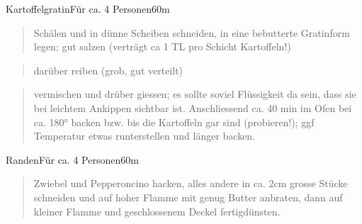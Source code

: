 \documentclass[
  a4paper,
]{article}
\begin{document}
\newpage

\begin{recipe}{Kartoffelgratin}{Für ca. 4 Personen}{60m}


\begin{quote}
Schälen und in dünne Scheiben schneiden, in eine bebutterte Gratinform
legen; gut salzen (verträgt ca 1 TL pro Schicht Kartoffeln!)
\end{quote}

\freeform\hrulefill


\begin{quote}
darüber reiben (grob, gut verteilt)
\end{quote}

\freeform\hrulefill


\begin{quote}
vermischen und drüber giessen; es sollte soviel Flüssigkeit da sein,
dass sie bei leichtem Ankippen sichtbar ist. Anschliessend ca. 40 min im
Ofen bei ca. 180° backen bzw. bis die Kartoffeln gar sind (probieren!);
ggf Temperatur etwas runterstellen und länger backen.
\end{quote}

\freeform\hrulefill\newline\freeform{}\end{recipe}

\newpage

\begin{recipe}{Randen}{Für ca. 4 Personen}{60m}


\begin{quote}
Zwiebel und Pepperoncino hacken, alles andere in ca. 2cm grosse Stücke
schneiden und auf hoher Flamme mit genug Butter anbraten, dann auf
kleiner Flamme und geschlossenem Deckel fertigdünsten.
\end{quote}

\freeform\hrulefill\newline\freeform{}\end{recipe}
\end{document}
